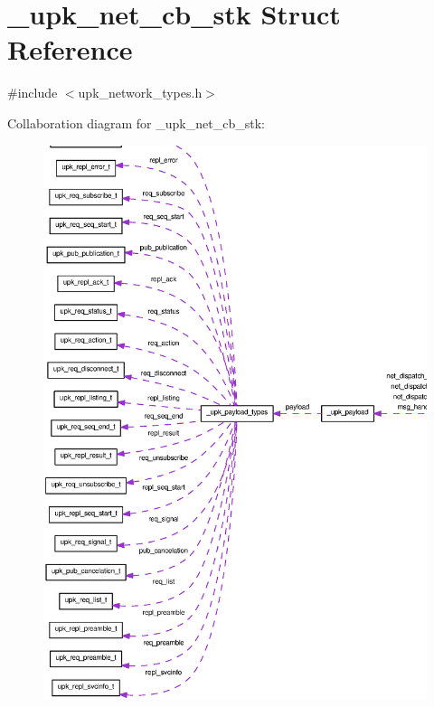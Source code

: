 \section{\_\-upk\_\-net\_\-cb\_\-stk Struct Reference}
\label{struct__upk__net__cb__stk}


{\ttfamily \#include $<$upk\_\-network\_\-types.h$>$}



Collaboration diagram for \_\-upk\_\-net\_\-cb\_\-stk:\nopagebreak
\begin{figure}[H]
\begin{center}
\leavevmode
\includegraphics[width=400pt]{struct__upk__net__cb__stk__coll__graph}
\end{center}
\end{figure}

